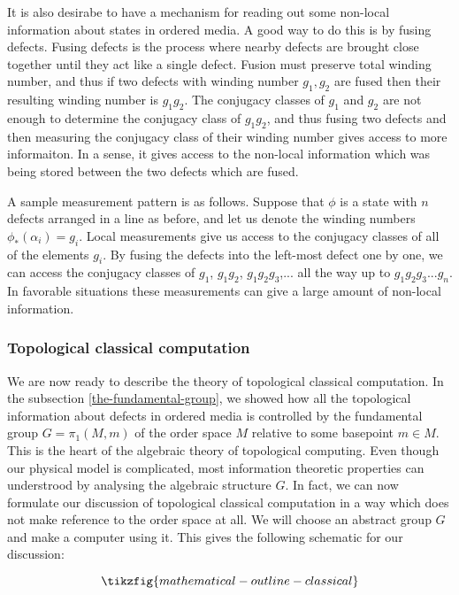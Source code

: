 It is also desirabe to have a mechanism for reading out some non-local information about states in ordered media. A good way to do this is by fusing defects. Fusing defects is the process where nearby defects are brought close together until they act like a single defect. Fusion must preserve total winding number, and thus if two defects with winding number $g_1,g_2$ are fused then their resulting winding number is $g_1g_2$. The conjugacy classes of $g_1$ and $g_2$ are not enough to determine the conjugacy class of $g_1g_2$, and thus fusing two defects and then measuring the conjugacy class of their winding number gives access to more informaiton. In a sense, it gives access to the non-local information which was being stored between the two defects which are fused.

A sample measurement pattern is as follows.  Suppose that $\phi$ is a state with $n$ defects arranged in a line as before, and let us denote the winding numbers $\phi_*(\alpha_i)=g_i$. Local measurements give us access to the conjugacy classes of all of the elements $g_i$. By fusing the defects into the left-most defect one by one, we can access the conjugacy classes of $g_1$, $g_1g_2$,  $g_1g_2g_3$,... all the way up to $g_1g_2g_3...g_n$. In favorable situations these measurements can give a large amount of non-local information.

\subsubsection{Topological classical computation}
\label{topological-classical-computation}

We are now ready to describe the theory of topological classical computation. In the subsection \ref{the-fundamental-group}, we showed how all the topological information about defects in ordered media is controlled by the fundamental group $G=\pi_1(M,m)$ of the order space $M$ relative to some basepoint $m\in M$. This is the heart of the algebraic theory of topological computing. Even though our physical model is complicated, most information theoretic properties can understrood by analysing the algebraic structure $G$. In fact, we can now formulate our discussion of topological classical computation in a way which does not make reference to the order space at all. We will choose an abstract group $G$ and make a computer using it. This gives the following schematic for our discussion:

\begin{equation*}
\tikzfig{mathematical-outline-classical}
\end{equation*}

